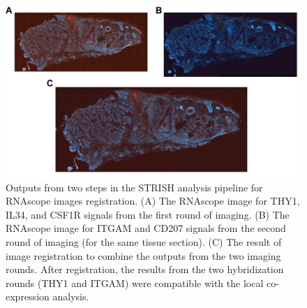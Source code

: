 \begin{figure}[htp]
\renewcommand{\figurename}{Supplementary Figure}
    \centering
    \includegraphics[width=0.75\columnwidth]{Chapter2/Figures/Supplemental_Fig_S7.png}
    \caption[Outputs from two steps in the STRISH analysis pipeline for RNAscope images registration.]{Outputs from two steps in the STRISH analysis pipeline for RNAscope images registration. (A) The RNAscope image for THY1, IL34, and CSF1R signals from the first round of imaging. (B) The RNAscope image for ITGAM and CD207 signals from the second round of imaging (for the same tissue section). (C) The result of image registration to combine the outputs from the two imaging rounds. After registration, the results from the two hybridization rounds (\ie THY1 and ITGAM) were compatible with the local co-expression analysis.}
    \label{fig:Chap2_Supfigure7}
\end{figure}
\typeout{}

% 

% 